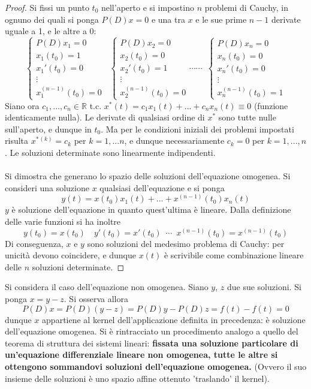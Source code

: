 \documentclass[10pt, oneside]{book}
\theoremstyle{plain}
\begin{document}
\begin{proof}
Si fissi un punto $t_0$ nell'aperto e si impostino $n$ problemi di Cauchy, in ognuno dei quali si ponga $P(D)x = 0$ e una tra $x$ e le sue prime $n-1$ derivate uguale a 1, e le altre a 0:
\[
\begin{cases}
P(D)x_1 = 0\\
x_1(t_0) = 1\\
x_1'(t_0) = 0\\
\vdots\\
x_1^{(n-1)}(t_0) = 0
\end{cases} 
\enspace
\begin{cases}
P(D)x_2 = 0\\
x_2(t_0) = 0\\
x_2'(t_0) = 1\\
\vdots\\
x_2^{(n-1)}(t_0) = 0
\end{cases} 
\cdots \cdots \enspace
\begin{cases}
P(D)x_n = 0\\
x_n(t_0) = 0\\
x_n'(t_0) = 0\\
\vdots\\
x_n^{(n-1)}(t_0) = 1
\end{cases} 
\]
Siano ora $c_1, ..., c_n \in \mathbb{R}$ t.c. $x^\ast (t) = c_1 x_1(t) + ... + c_n x_n(t) \equiv 0$ (funzione identicamente nulla). Le derivate di qualsiasi ordine di $x^\ast$ sono tutte nulle sull'aperto, e dunque in $t_0$. Ma per le condizioni iniziali dei problemi impostati risulta $x^\ast{}^{(k)} = c_k$ per $k = 1, ...n$, e dunque necessariamente $c_k = 0$ per $k = 1, ..., n$. Le soluzioni determinate sono linearmente indipendenti.
\\~\\Si dimostra che generano lo spazio delle soluzioni dell'equazione omogenea. Si consideri una soluzione $x$ qualsiasi dell'equazione e si ponga
\[y(t) = x(t_0) x_1(t) + ... + x^{(n-1)}(t_0) x_n(t)\]
$y$ è soluzione dell'equazione in quanto quest'ultima è lineare. Dalla definizione delle varie funzioni si ha inoltre
\[y(t_0) = x(t_0) \quad y'(t_0) = x'(t_0) \enspace \cdots \enspace x^{(n-1)}(t_0) = x^{(n-1)}(t_0)\]
Di conseguenza, $x$ e $y$ sono soluzioni del medesimo problema di Cauchy: per unicità devono coincidere, e dunque $x(t)$ è scrivibile come combinazione lineare delle $n$ soluzioni determinate.
\end{proof}
Si considera il caso dell'equazione non omogenea. Siano $y$, $z$ due sue soluzioni. Si ponga $x = y - z$. Si osserva allora
\[P(D)x = P(D)(y-z) = P(D)y - P(D)z = f(t) - f(t) = 0\]
dunque $x$ appartiene al kernel dell'applicazione definita in precedenza: è soluzione dell'equazione omogenea. Si è rintracciato un procedimento analogo a quello del teorema di struttura dei sistemi lineari: \textbf{fissata una soluzione particolare di un'equazione differenziale lineare non omogenea, tutte le altre si ottengono sommandovi soluzioni dell'equazione omogenea.} (Ovvero il suo insieme delle soluzioni è uno spazio affine ottenuto 'traslando' il kernel).
\end{document}
